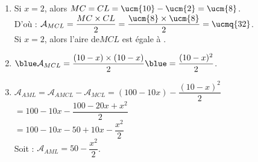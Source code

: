 {\begin{corrige}
\begin{enumerate}
\begin{enumerate}
            \item Si $x =2$, alors $MC =CL =\ucm{10} -\ucm{2} =\ucm{8}$. \\ [1mm]
            D'où : $\mathcal{A}_{MCL} =\dfrac{MC\times CL}{2} =\dfrac{\ucm{8}\times\ucm{8}}{2} =\ucmq{32}$. \\ [1mm]
              {\blue Si $x =2$, alors l’aire de$MCL$ est égale à }. \smallskip
            \item ${\blue \mathcal{A}_{MCL}} =\dfrac{(10-x)\times(10-x)}{2} {\blue =\dfrac{(10-x)^2}{2}}$. \\
            \item $\mathcal{A}_{AML} =\mathcal{A}_{AMCL}-\mathcal{A}_{MCL} =(100-10x)-\dfrac{(10-x)^2}{2}$ \\ [1mm]
               \hspace*{4.2cm} $=100-10x-\dfrac{100-20x+x^2}{2}$  \\ [1mm]
               \hspace*{4.2cm} $=100-10x-50+10x-\dfrac{x^2}{2}$ \\ [1mm]
               Soit : {\blue $\mathcal{A}_{AML} =50-\dfrac{x^2}{2}$}.
         \end{enumerate}
   \end{enumerate}
\end{corrige}

\bigskip


}
